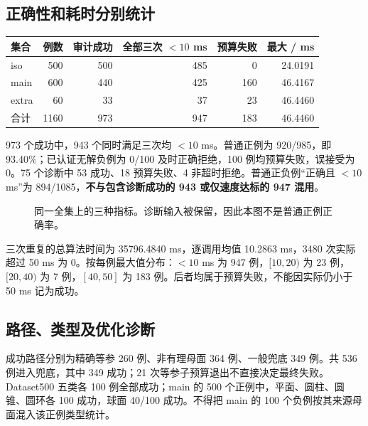 \documentclass[UTF8,zihao=5,fontset=windows,a4paper]{ctexart}
\begin{document}
\subsection{正确性和耗时分别统计}
\begin{center}\small\renewcommand{\arraystretch}{1.2}
\begin{tabularx}{\linewidth}{@{}Yrrrrr@{}}\toprule
集合 & 例数 & 审计成功 & 全部三次 $<10$ ms & 预算失败 & 最大 / ms\\\midrule
iso & 500 & 500 & 485 & 0 & 24.0191\\
main & 600 & 440 & 425 & 160 & 46.4167\\
extra & 60 & 33 & 37 & 23 & 46.4460\\\midrule
合计 & 1160 & 973 & 947 & 183 & 46.4460\\\bottomrule
\end{tabularx}
\end{center}
973 个成功中，943 个同时满足三次均 $<10$ ms。普通正例为 920/985，即 93.40\%；已认证无解负例为 0/100 及时正确拒绝，100 例均预算失败，误接受为 0。75 个诊断中 53 成功、18 预算失败、4 非超时拒绝。普通正负例“正确且 $<10$ ms”为 894/1085，\textbf{不与包含诊断成功的 943 或仅速度达标的 947 混用}。

\begin{figure}[h]\centering
{}
\caption{同一全集上的三种指标。诊断输入被保留，因此本图不是普通正例正确率。}
\end{figure}

三次重复的总算法时间为 35796.4840 ms，逐调用均值 10.2863 ms，3480 次实际超过 50 ms 为 0。按每例最大值分布：$<10$ ms 为 947 例，$[10,20)$ 为 23 例，$[20,40)$ 为 7 例，$[40,50]$ 为 183 例。后者均属于预算失败，不能因实际仍小于 50 ms 记为成功。

\subsection{路径、类型及优化诊断}
成功路径分别为精确等参 260 例、非有理母面 364 例、一般兜底 349 例。共 536 例进入兜底，其中 349 成功；21 次等参子预算退出不直接决定最终失败。Dataset500 五类各 100 例全部成功；main 的 500 个正例中，平面、圆柱、圆锥、圆环各 100 成功，球面 40/100 成功。不得把 main 的 100 个负例按其来源母面混入该正例类型统计。
\end{document}

